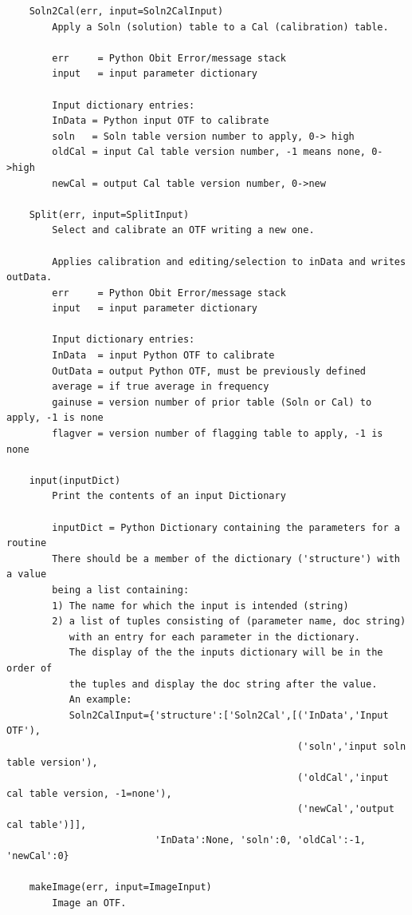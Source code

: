 \documentclass[11pt]{report}
\begin{document}
\begin{verbatim}
    Soln2Cal(err, input=Soln2CalInput)
        Apply a Soln (solution) table to a Cal (calibration) table.
        
        err     = Python Obit Error/message stack
        input   = input parameter dictionary
        
        Input dictionary entries:
        InData = Python input OTF to calibrate
        soln   = Soln table version number to apply, 0-> high
        oldCal = input Cal table version number, -1 means none, 0->high
        newCal = output Cal table version number, 0->new
    
    Split(err, input=SplitInput)
        Select and calibrate an OTF writing a new one.
        
        Applies calibration and editing/selection to inData and writes outData.
        err     = Python Obit Error/message stack
        input   = input parameter dictionary
        
        Input dictionary entries:
        InData  = input Python OTF to calibrate
        OutData = output Python OTF, must be previously defined
        average = if true average in frequency
        gainuse = version number of prior table (Soln or Cal) to apply, -1 is none
        flagver = version number of flagging table to apply, -1 is none
    
    input(inputDict)
        Print the contents of an input Dictionary
        
        inputDict = Python Dictionary containing the parameters for a routine
        There should be a member of the dictionary ('structure') with a value
        being a list containing:
        1) The name for which the input is intended (string)
        2) a list of tuples consisting of (parameter name, doc string)
           with an entry for each parameter in the dictionary.
           The display of the the inputs dictionary will be in the order of
           the tuples and display the doc string after the value.
           An example:
           Soln2CalInput={'structure':['Soln2Cal',[('InData','Input OTF'),
                                                   ('soln','input soln table version'),
                                                   ('oldCal','input cal table version, -1=none'),
                                                   ('newCal','output cal table')]],
                          'InData':None, 'soln':0, 'oldCal':-1, 'newCal':0}
    
    makeImage(err, input=ImageInput)
        Image an OTF.
        

\end{verbatim}
\end{document}
